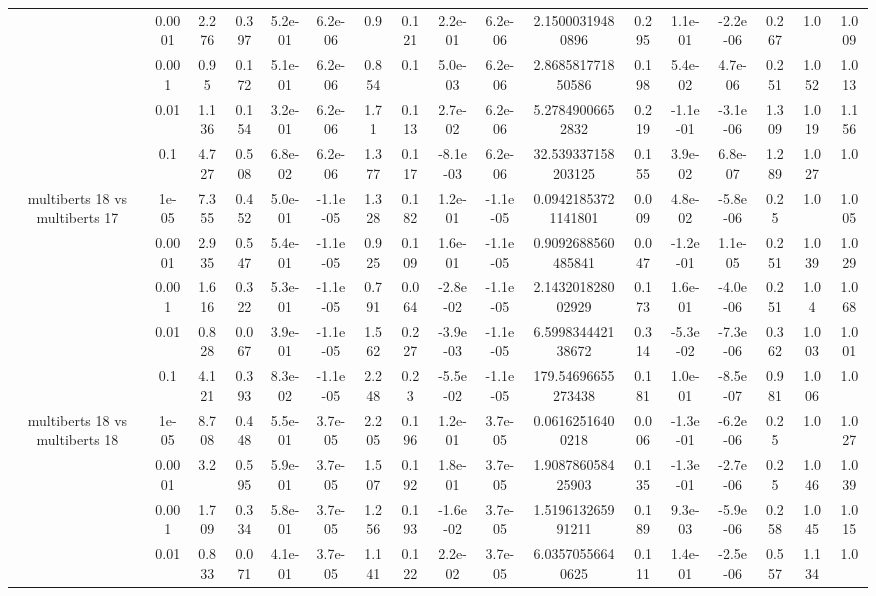 \begin{tabular}{|c|c|c|c|c|c|c|c|c|c|c|c|c|c|c|c|c|}
 & 0.0001 & 2.276 & 0.397 & 5.2e-01 & 6.2e-06 & 0.9 & 0.121 & 2.2e-01 & 6.2e-06 & 2.15000319480896 & 0.295 & 1.1e-01 & -2.2e-06 & 0.267 & 1.0 & 1.009 \\
 & 0.001 & 0.95 & 0.172 & 5.1e-01 & 6.2e-06 & 0.854 & 0.1 & 5.0e-03 & 6.2e-06 & 2.868581771850586 & 0.198 & 5.4e-02 & 4.7e-06 & 0.251 & 1.052 & 1.013 \\
 & 0.01 & 1.136 & 0.154 & 3.2e-01 & 6.2e-06 & 1.71 & 0.113 & 2.7e-02 & 6.2e-06 & 5.27849006652832 & 0.219 & -1.1e-01 & -3.1e-06 & 1.309 & 1.019 & 1.156 \\
 & 0.1 & 4.727 & 0.508 & 6.8e-02 & 6.2e-06 & 1.377 & 0.117 & -8.1e-03 & 6.2e-06 & 32.539337158203125 & 0.155 & 3.9e-02 & 6.8e-07 & 1.289 & 1.027 & 1.0 \\
\hline
\multirow{5}{*}{multiberts 18 vs multiberts 17} & 1e-05 & 7.355 & 0.452 & 5.0e-01 & -1.1e-05 & 1.328 & 0.182 & 1.2e-01 & -1.1e-05 & 0.09421853721141801 & 0.009 & 4.8e-02 & -5.8e-06 & 0.25 & 1.0 & 1.005 \\
 & 0.0001 & 2.935 & 0.547 & 5.4e-01 & -1.1e-05 & 0.925 & 0.109 & 1.6e-01 & -1.1e-05 & 0.9092688560485841 & 0.047 & -1.2e-01 & 1.1e-05 & 0.251 & 1.039 & 1.029 \\
 & 0.001 & 1.616 & 0.322 & 5.3e-01 & -1.1e-05 & 0.791 & 0.064 & -2.8e-02 & -1.1e-05 & 2.143201828002929 & 0.173 & 1.6e-01 & -4.0e-06 & 0.251 & 1.04 & 1.068 \\
 & 0.01 & 0.828 & 0.067 & 3.9e-01 & -1.1e-05 & 1.562 & 0.227 & -3.9e-03 & -1.1e-05 & 6.599834442138672 & 0.314 & -5.3e-02 & -7.3e-06 & 0.362 & 1.003 & 1.001 \\
 & 0.1 & 4.121 & 0.393 & 8.3e-02 & -1.1e-05 & 2.248 & 0.23 & -5.5e-02 & -1.1e-05 & 179.54696655273438 & 0.181 & 1.0e-01 & -8.5e-07 & 0.981 & 1.006 & 1.0 \\
\hline
\multirow{5}{*}{multiberts 18 vs multiberts 18} & 1e-05 & 8.708 & 0.448 & 5.5e-01 & 3.7e-05 & 2.205 & 0.196 & 1.2e-01 & 3.7e-05 & 0.06162516400218 & 0.006 & -1.3e-01 & -6.2e-06 & 0.25 & 1.0 & 1.027 \\
 & 0.0001 & 3.2 & 0.595 & 5.9e-01 & 3.7e-05 & 1.507 & 0.192 & 1.8e-01 & 3.7e-05 & 1.908786058425903 & 0.135 & -1.3e-01 & -2.7e-06 & 0.25 & 1.046 & 1.039 \\
 & 0.001 & 1.709 & 0.334 & 5.8e-01 & 3.7e-05 & 1.256 & 0.193 & -1.6e-02 & 3.7e-05 & 1.519613265991211 & 0.189 & 9.3e-03 & -5.9e-06 & 0.258 & 1.045 & 1.015 \\
 & 0.01 & 0.833 & 0.071 & 4.1e-01 & 3.7e-05 & 1.141 & 0.122 & 2.2e-02 & 3.7e-05 & 6.03570556640625 & 0.111 & 1.4e-01 & -2.5e-06 & 0.557 & 1.134 & 1.0 \\

\end{tabular}
